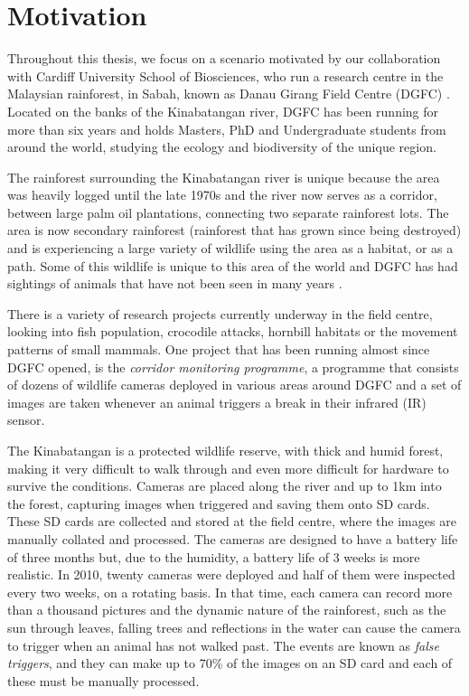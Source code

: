 \section{Motivation}\label{int:mot}
Throughout this thesis, we focus on a scenario motivated by our collaboration with Cardiff University School of Biosciences, who run a research centre in the Malaysian rainforest, in Sabah, known as Danau Girang Field Centre (DGFC)  \cite{dgfc}. Located on the banks of the Kinabatangan river, DGFC has been running for more than six years and holds Masters, PhD and Undergraduate students from around the world, studying the ecology and biodiversity of the unique region.

The rainforest surrounding the Kinabatangan river is unique because the area was heavily logged until the late 1970s and the river now serves as a corridor, between large palm oil plantations, connecting two separate rainforest lots. The area is now secondary rainforest (rainforest that has grown since being destroyed) and is experiencing a large variety of wildlife using the area as a habitat, or as a path. Some of this wildlife is unique to this area of the world and DGFC has had sightings of animals that have not been seen in many years \cite{Goossens2012}.

There is a variety of research projects currently underway in the field centre, looking into fish population, crocodile attacks, hornbill habitats or the movement patterns of small mammals. One project that has been running almost since DGFC opened, is the \textit{corridor monitoring programme}, a programme that consists of dozens of wildlife cameras deployed in various areas around DGFC and a set of images are taken whenever an animal triggers a break in their infrared (IR)  sensor.

The Kinabatangan is a protected wildlife reserve, with thick and humid forest, making it very difficult to walk through and even more difficult for hardware to survive the conditions. Cameras are placed along the river and up to 1km into the forest, capturing images when triggered and saving them onto SD cards. These SD cards are collected and stored at the field centre, where the images are manually collated and processed. The cameras are designed to have a battery life of three months but, due to the humidity, a battery life of 3 weeks is more realistic. In 2010, twenty cameras were deployed and half of them were inspected every two weeks, on a rotating basis. In that time, each camera can record more than a thousand pictures and the dynamic nature of the rainforest, such as the sun through leaves, falling trees and reflections in the water can cause the camera to trigger when an animal has not walked past. The events are known as \textit{false triggers}, and they can make up to 70\% of the images on an SD card and each of these must be manually processed. 


